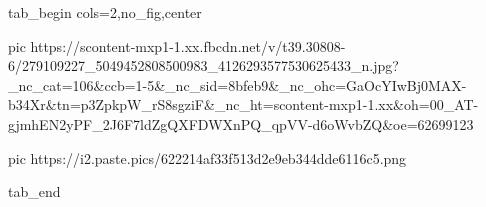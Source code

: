  
 
 
 
 

\ifcmt
  tab_begin cols=2,no_fig,center

     pic https://scontent-mxp1-1.xx.fbcdn.net/v/t39.30808-6/279109227_5049452808500983_4126293577530625433_n.jpg?_nc_cat=106&ccb=1-5&_nc_sid=8bfeb9&_nc_ohc=GaOcYIwBj0MAX-b34Xr&tn=p3ZpkpW_rS8sgziF&_nc_ht=scontent-mxp1-1.xx&oh=00_AT-gjmhEN2yPF_2J6F7ldZgQXFDWXnPQ_qpVV-d6oWvbZQ&oe=62699123

		 pic https://i2.paste.pics/622214af33f513d2e9eb344dde6116c5.png

  tab_end
\fi
